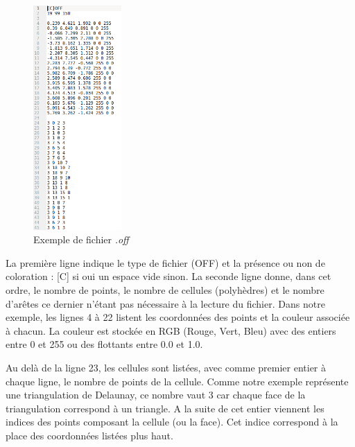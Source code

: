 \begin{figure}[ht]
\centering
  \includegraphics[width=0.3\textwidth]{figures/off_file.png}
  \caption{Exemple de fichier \textit{.off}}
  \label{fig::off_file}
\end{figure}

La première ligne indique le type de fichier (OFF) et la présence ou non de coloration :
[C] si oui un espace vide sinon. La seconde ligne donne, dans cet ordre, le nombre
de points, le nombre de cellules (polyhèdres) et le nombre d'arêtes ce dernier n'étant
pas nécessaire à la lecture du fichier. Dans notre exemple, les lignes 4 à 22 listent
les coordonnées des points et la couleur associée à chacun. La couleur est stockée en RGB
(Rouge, Vert, Bleu) avec des entiers entre 0 et 255 ou des flottants entre 0.0 et 1.0.

Au delà de la ligne 23, les cellules sont listées, avec comme premier entier à chaque
ligne, le nombre de points de la cellule. Comme notre exemple représente une triangulation
de Delaunay, ce nombre vaut 3 car chaque face de la triangulation correspond à un
triangle. A la suite de cet entier viennent les indices des points composant la cellule
(ou la face). Cet indice correspond à la place des coordonnées listées plus haut.
